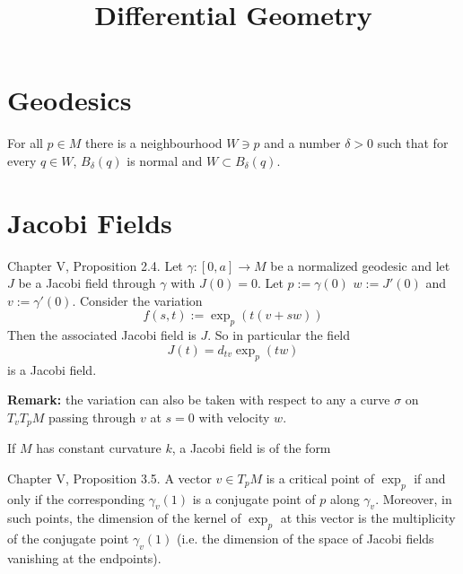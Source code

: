 



\title{Differential Geometry}
\maketitle

\label{section-phantom}

\tableofcontents

\section{Geodesics}
\label{section-geodesics}

\begin{proposition}
\label{proposition-totally-normal-neighbourhoods}
For all $p \in M$ there is a neighbourhood $W \ni p$ and a number $\delta>0$ 
 such that for every $q \in W$, $B_\delta(q)$ is normal and
 $W \subset B_\delta(q)$. 
\end{proposition}

\section{Jacobi Fields}
\label{section-jacobi-fields}

\begin{proposition}
\label{proposition-everyday-jacobi-field}
\cite{doc} Chapter V, Proposition 2.4. Let $\gamma:[0,a]\to M$ be a normalized
geodesic and let $J$ be a Jacobi field through $\gamma$ with $J(0)=0$.
Let $p:=\gamma(0)$ $w:=J'(0)$ and  $v:=\gamma'(0)$. 
Consider the variation
$$
f(s,t):=\operatorname{exp}_{p}(t(v+sw))
$$
Then the associated Jacobi field is $J$. So in particular the field
$$
J(t)=d_{tv}\operatorname{exp}_p(tw)
$$
is a Jacobi field.

{\bf Remark:} the variation can also be taken with respect to
any a curve $\sigma$ on $T_vT_{p}M$ passing through $v$ 
at $s=0$ with velocity $w$.

\end{proposition}

\begin{example}
\label{example-jacobi-fields-in-constant-curvature}
If $M$ has constant curvature $k$, a Jacobi field is of the form
\end{example}

\begin{proposition}
\label{proposition-critical-points-exp}
\cite{doc} Chapter V, Proposition 3.5. A vector $v \in T_pM$ is a critical
point of $\operatorname{exp}_p$ if and only if the corresponding 
$\gamma_v(1)$ is a conjugate point of $p$ along $\gamma_v$.
Moreover, in such points, the dimension of the kernel of 
$\operatorname{exp}_p$ at this vector is the multiplicity
of the conjugate point $\gamma_v(1)$ 
(i.e. the dimension of the space of Jacobi fields vanishing 
at the endpoints).
\end{proposition}


